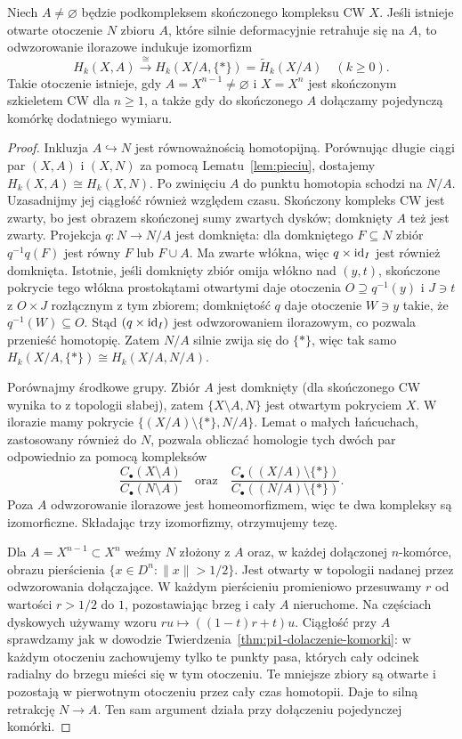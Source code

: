 \begin{lemat}
\label{lem:iloraz-cw-homologia}
Niech $A\ne\varnothing$ będzie podkompleksem skończonego
kompleksu CW $X$. Jeśli istnieje otwarte
otoczenie $N$ zbioru $A$, które silnie
deformacyjnie retrahuje się na $A$, to
odwzorowanie ilorazowe indukuje izomorfizm
\[
 H_k(X,A)\xrightarrow{\ \cong\ }
 H_k(X/A,\{*\})=\widetilde H_k(X/A)
 \quad(k\geq0).
\]
Takie otoczenie istnieje, gdy
$A=X^{n-1}\ne\varnothing$ i $X=X^n$ jest skończonym
szkieletem CW dla $n\geq1$, a także gdy do skończonego $A$
dołączamy pojedynczą komórkę dodatniego wymiaru.
\end{lemat}
\begin{proof}
Inkluzja $A\hookrightarrow N$ jest
równoważnością homotopijną. Porównując
długie ciągi par $(X,A)$ i $(X,N)$
za pomocą Lematu~\ref{lem:pieciu},
dostajemy $H_k(X,A)\cong H_k(X,N)$.
Po zwinięciu $A$ do punktu homotopia schodzi na $N/A$.
Uzasadnijmy jej ciągłość również względem czasu.
Skończony kompleks CW jest zwarty, bo jest obrazem skończonej
sumy zwartych dysków; domknięty $A$ też jest zwarty.
Projekcja $q:N\to N/A$ jest domknięta: dla domkniętego $F\subseteq N$
zbiór $q^{-1}q(F)$ jest równy $F$ lub $F\cup A$.
Ma zwarte włókna, więc $q\times\mathrm{id}_I$ jest również domknięta.
Istotnie, jeśli domknięty zbiór omija włókno nad $(y,t)$,
skończone pokrycie tego włókna prostokątami otwartymi daje
otoczenia $O\supseteq q^{-1}(y)$ i $J\ni t$ z $O\times J$
rozłącznym z tym zbiorem; domkniętość $q$ daje otoczenie
$W\ni y$ takie, że $q^{-1}(W)\subseteq O$.
Stąd $(q\times\mathrm{id}_I)$ jest odwzorowaniem ilorazowym,
co pozwala przenieść homotopię. Zatem $N/A$ silnie zwija się do $\{*\}$,
więc tak samo
$H_k(X/A,\{*\})\cong H_k(X/A,N/A)$.

Porównajmy środkowe grupy.
Zbiór $A$ jest domknięty
(dla skończonego CW wynika to
z topologii słabej), zatem
$\{X\setminus A,N\}$ jest
otwartym pokryciem $X$.
W ilorazie mamy pokrycie
$\{(X/A)\setminus\{*\},N/A\}$.
Lemat o małych łańcuchach,
zastosowany również do $N$,
pozwala obliczać homologie
tych dwóch par odpowiednio za pomocą kompleksów
\[
 \frac{C_\bullet(X\setminus A)}
      {C_\bullet(N\setminus A)}
 \quad\text{oraz}\quad
 \frac{C_\bullet((X/A)\setminus\{*\})}
      {C_\bullet((N/A)\setminus\{*\})}.
\]
Poza $A$ odwzorowanie ilorazowe jest
homeomorfizmem, więc te dwa
kompleksy są izomorficzne.
Składając trzy izomorfizmy,
otrzymujemy tezę.

Dla $A=X^{n-1}\subset X^n$
weźmy $N$ złożony z $A$ oraz,
w każdej dołączonej $n$-komórce,
obrazu pierścienia
$\{x\in D^n:\|x\|>1/2\}$.
Jest otwarty w topologii
nadanej przez odwzorowania dołączające.
W każdym pierścieniu promieniowo
przesuwamy $r$ od wartości
$r>1/2$ do $1$, pozostawiając
brzeg i cały $A$ nieruchome.
Na częściach dyskowych używamy wzoru
$ru\mapsto((1-t)r+t)u$. Ciągłość przy $A$ sprawdzamy jak
w dowodzie Twierdzenia~\ref{thm:pi1-dolaczenie-komorki}:
w każdym otoczeniu zachowujemy tylko te punkty pasa, których
cały odcinek radialny do brzegu mieści się w tym otoczeniu.
Te mniejsze zbiory są otwarte i pozostają w pierwotnym otoczeniu
przez cały czas homotopii. Daje to silną retrakcję $N\to A$.
Ten sam argument działa przy dołączeniu pojedynczej komórki.
\end{proof}

